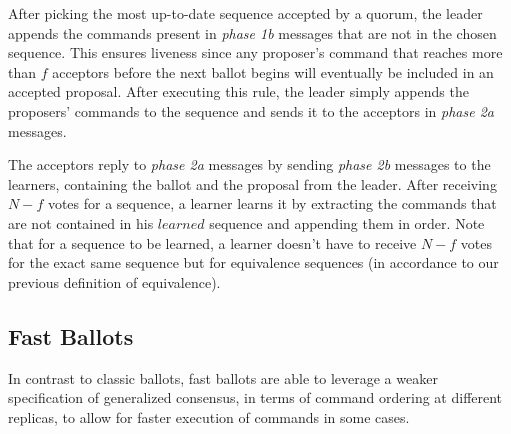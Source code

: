 After picking the most up-to-date sequence accepted by a quorum, the leader appends the commands present in \textit{phase 1b} messages that are not in the chosen sequence. This ensures liveness since any proposer's command that reaches more than $f$ acceptors before the next ballot begins will eventually be included in an accepted proposal. After executing this rule, the leader simply appends the proposers' commands to the sequence and sends it to the acceptors in \textit{phase 2a} messages.\par

The acceptors reply to \textit{phase 2a} messages by sending \textit{phase 2b} messages to the learners, containing the ballot and the proposal from the leader. After receiving $N-f$ votes for a sequence, a learner learns it by extracting the commands that are not contained in his $learned$ sequence and appending them in order. Note that for a sequence to be learned, a learner doesn't have to receive $N-f$ votes for the exact same sequence but for equivalence sequences (in accordance to our previous definition of equivalence).

\subsection{Fast Ballots} 

In contrast to classic ballots, fast ballots are able to leverage a weaker specification of generalized consensus, in terms of command ordering at different replicas, to allow for faster execution of commands in some cases.

